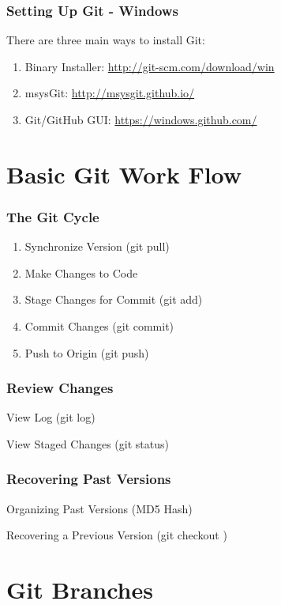 \begin{frame}
\frametitle{\large{Setting Up Git - Windows}}
There are three main ways to install Git:
\begin{enumerate}
\item Binary Installer: \href{http://git-scm.com/download/win}{http://git-scm.com/download/win}
\item msysGit: \href{http://msysgit.github.io/}{http://msysgit.github.io/}
\item Git/GitHub GUI: \href{https://windows.github.com/}{https://windows.github.com/}
\end{enumerate}
\end{frame}


\section[Basic Git]{Basic Git Work Flow}

\begin{frame}
    \frametitle{The Git Cycle}
    \begin{enumerate}
    \item Synchronize Version (git pull)\pause
    \item Make Changes to Code \pause
    \item Stage Changes for Commit (git add) \pause
    \item Commit Changes (git commit) \pause
    \item Push to Origin (git push) \pause
    \end{enumerate}
\end{frame}

\begin{frame}
    \frametitle{ Review Changes}
    View Log (git log)
    
    View Staged Changes (git status)
\end{frame}

    
\begin{frame}
    \frametitle{Recovering Past Versions}
    Organizing Past Versions (MD5 Hash)
    
    Recovering a Previous Version (git checkout )
\end{frame}
    
    
\section[Branches]{Git Branches}

